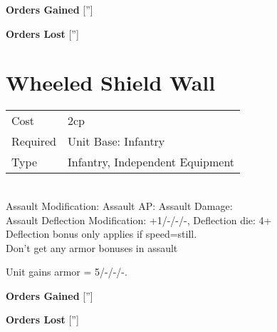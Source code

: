 {\bf Orders Gained}
['']

{\bf Orders Lost}
['']
\section{ Wheeled Shield Wall }

\begin{tabular}{ll}
    Cost & 2cp \\
    Required & Unit Base: Infantry\\
    Type & Infantry, Independent Equipment\\
\end{tabular}
\ \\
Assault Modification:  Assault AP:  Assault Damage: \\
Assault Deflection Modification: +1/-/-/-, Deflection die: 4+ \\
Deflection bonus only applies if speed=still. \\ Don't get any armor bonuses in assault

Unit gains armor = 5/-/-/-. 

{\bf Orders Gained}
['']

{\bf Orders Lost}
['']
